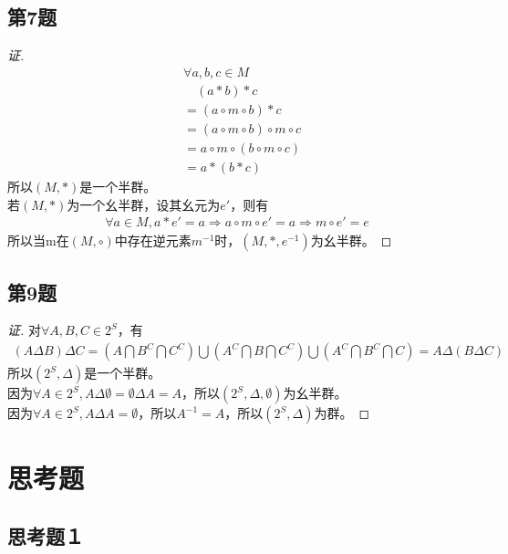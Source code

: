 \documentclass[11pt]{article}
\begin{document}
\subsection{第7题}
\begin{proof}[证]
  \begin{align*}
    &\forall a, b, c \in M \\
    &\quad (a * b) * c \\
    &= (a \circ m \circ b) * c \\
    &= (a \circ m \circ b) \circ m \circ c \\
    &= a \circ m \circ (b \circ m \circ c) \\
    &= a * (b * c)
  \end{align*}
  所以$(M, *)$是一个半群。\\
  若$(M, *)$为一个幺半群，设其幺元为$e'$，则有
  \begin{gather*}
    \forall a \in M, a * e' = a \Rightarrow a \circ m \circ e' = a \Rightarrow m \circ e' = e
  \end{gather*}
  所以当m在$(M, \circ)$中存在逆元素$m^{-1}$时，$(M, *, e^{-1})$为幺半群。
\end{proof}

\subsection{第9题}
\begin{proof}[证]
  对$\forall A, B, C \in 2^S$，有
  \begin{gather*}
    (A \Delta B) \Delta C = (A \bigcap B^C \bigcap C^C) \bigcup (A^C \bigcap B \bigcap C^C) \bigcup (A^C \bigcap B^C \bigcap C) = A \Delta (B \Delta C)
  \end{gather*}
  所以$(2^S, \Delta)$是一个半群。\\
  因为$\forall A \in 2^S, A \Delta \emptyset = \emptyset \Delta A = A$，所以$(2^S, \Delta, \emptyset)$为幺半群。\\
  因为$\forall A \in 2^S, A \Delta A = \emptyset$，所以$A^{-1} = A$，所以$(2^S, \Delta)$为群。
\end{proof}

\section{思考题}
\subsection{思考题１}
\end{document}
